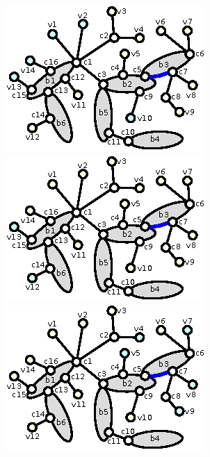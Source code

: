 \documentclass[a4]{jgaa-art}
\begin{document}
\begin{figure}[!htb]
  \centering
  \begin{minipage}[b]{0.3\textwidth}
    \includegraphics[width=\textwidth]{marked_bush_form_04}
  \end{minipage}
  \hfill
  \begin{minipage}[b]{0.3\textwidth}
    \includegraphics[width=\textwidth]{marked_bush_form_05}
  \end{minipage}
  \hfill
  \begin{minipage}[b]{0.3\textwidth}
    \includegraphics[width=\textwidth]{marked_bush_form_06}

\end{minipage}
\end{figure}
\end{document}
